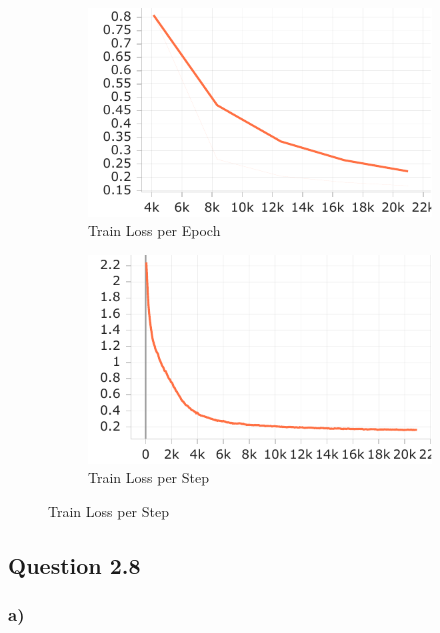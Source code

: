 \documentclass{article}
\begin{document}
\begin{figure}[H]
    \centering
    \begin{subfigure}{0.48\textwidth}  %
        \centering
        \includegraphics[width=\textwidth]{images/train_loss_epoch.pdf}
        \caption{Train Loss per Epoch}
        \label{fig:train_loss_epochs}
    \end{subfigure}
    \hfill
    \begin{subfigure}{0.48\textwidth}
        \centering
        \includegraphics[width=\textwidth]{images/train_loss_step.pdf}
        \caption{Train Loss per Step}
        \label{fig:train_loss_steps}
    \end{subfigure}
\end{figure}

\subsection*{Question 2.8}

\subsubsection*{a)}
\end{document}
